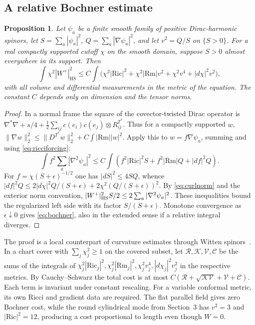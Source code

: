 \documentclass[11pt]{article}
\newtheorem{proposition}[theorem]{Proposition}
\theoremstyle{remark}
\newcommand{\Rm}{\mathrm{Rm}}
\newcommand{\Ric}{\mathrm{Ric}}
\begin{document}
\subsection{A relative Bochner estimate}
\begin{proposition}\label{prop:bochner}
Let \(\psi_a\) be a finite smooth family of positive Dirac-harmonic spinors, let \(S=\sum_a|\psi_a|^2\), \(Q=\sum_a|\nabla\psi_a|^2\), and let \(v^2=Q/S\) on \(\{S>0\}\). For a real compactly supported cutoff \(\chi\) on the smooth domain, suppose \(S>0\) almost everywhere in its support. Then
\begin{equation}
 \int\chi^2|W^+|_{\mathrm{HS}}^2
   \le C\int\bigl(\chi^2|\Ric|^2+\chi^2|\Rm|v^2
                            +\chi^2v^4+|d\chi|^2v^2\bigr),
 \label{eq:bochner}
\end{equation}
with all volume and differential measurements in the metric of the equation. The constant \(C\) depends only on dimension and the tensor norms.
\end{proposition}
\begin{proof}
In a normal frame the square of the covector-twisted Dirac operator is \(\nabla^*\nabla+s/4+\tfrac12\sum_{ij}c(e_i)c(e_j)\otimes R^{T^*}_{ij}\). Thus for a compactly supported \(w\), \(\|\nabla w\|_2^2\le \|D^{T^*}w\|_2^2+C\int|\Rm||w|^2\). Apply this to \(w=f\nabla\psi_a\), summing and using \eqref{eq:ricciforcing}:
\[
 \int f^2\sum_a|\nabla^2\psi_a|^2
 \le C\int(f^2|\Ric|^2 S+f^2|\Rm|Q+|df|^2Q).
\]
For \(f=\chi(S+\epsilon)^{-1/2}\) one has \(|dS|^2\le4SQ\), whence
\(|df|^2Q\le2|d\chi|^2Q/(S+\epsilon)+2\chi^2(Q/(S+\epsilon))^2\).
By \eqref{eq:curlnorm} and the exterior norm convention,
\(|W^+|_{\rm HS}^2 S/2\le2\sum_a|\nabla^2\psi_a|^2\).
These inequalities bound the regularized left side with its factor \(S/(S+\epsilon)\). Monotone convergence as \(\epsilon\downarrow0\) gives \eqref{eq:bochner}, also in the extended sense if a relative integral diverges.
\end{proof}
The proof is a local counterpart of curvature estimates through Witten spinors~\cite[\S3]{BrayFinster1999Curvature,Finster2008LevelSet}. In a chart cover with \(\sum_j\chi_j^2\ge1\) on the covered subset, let \(\mathcal R,\mathcal K,\mathcal V,\mathcal C\) be the sums of the integrals of \(\chi_j^2|\Ric_j|^2,\chi_j^2|\Rm_j|^2,\chi_j^2v_j^4,|d\chi_j|^2v_j^2\) in the respective metrics. By Cauchy--Schwarz the total cost is at most \(C(\mathcal R+\sqrt{\mathcal K\mathcal V}+\mathcal V+\mathcal C)\). Each term is invariant under constant rescaling. For a variable conformal metric, its own Ricci and gradient data are required. The flat parallel field gives zero Bochner cost, while the round cylindrical mode from Section~3 has \(v^2=3\) and \(|\Ric|^2=12\), producing a cost proportional to length even though \(W=0\).
\end{document}
